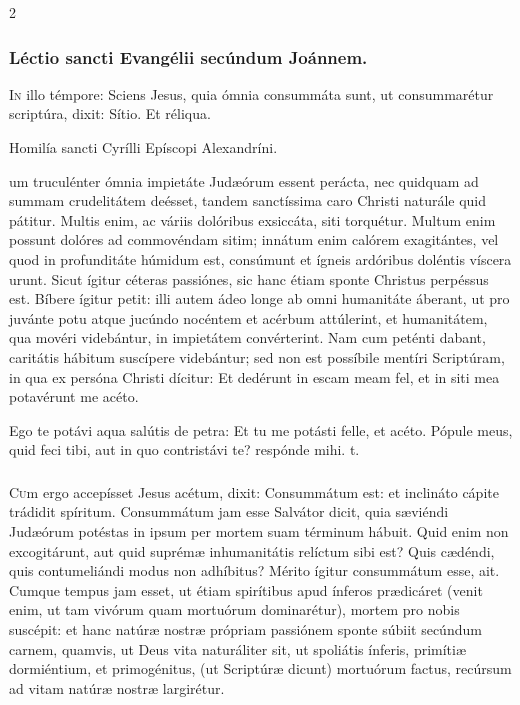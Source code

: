 \documentclass[9pt,twoside]{extarticle}
\begin{document}
\begin{multicols}{2}
\subsubsection*{\center Léctio sancti Evangélii secúndum Joánnem.}
\begin{center}\end{center}
\lettrine{I}n illo témpore: Sciens Jesus, quia ómnia consummáta sunt, ut consummarétur scriptúra, dixit: Sítio. Et réliqua.

\begin{center}Homilía sancti Cyrílli Epíscopi Alexandríni.\\
\end{center}
um truculénter ómnia impietáte Judæórum essent perácta, nec quidquam ad summam crudelitátem deésset, tandem sanctíssima caro Christi naturále quid pátitur. Multis enim, ac váriis dolóribus exsiccáta, siti torquétur. Multum enim possunt dolóres ad commovéndam sitim; innátum enim calórem exagitántes, vel quod in profunditáte húmidum est, consúmunt et ígneis ardóribus doléntis víscera urunt. Sicut ígitur céteras passiónes, sic hanc étiam sponte Christus perpéssus est. Bíbere ígitur petit: illi autem ádeo longe ab omni humanitáte áberant, ut pro juvánte potu atque jucúndo nocéntem et acérbum attúlerint, et humanitátem, qua movéri videbántur, in impietátem convérterint. Nam cum peténti dabant, caritátis hábitum suscípere videbántur; sed non est possíbile mentíri Scriptúram, in qua ex persóna Christi dícitur: Et dedérunt in escam meam fel, et in siti mea potavérunt me acéto.

\begin{tightlist}{}
\item {} Ego te potávi aqua salútis de petra: \textred{*} Et tu me potásti felle, et acéto.  Pópule meus, quid feci tibi, aut in quo contristávi te? respónde mihi. t.
\end{tightlist}

\subsubsection*{\center{}}
\lettrine{C}um ergo accepísset Jesus acétum, dixit: Consummátum est: et inclináto cápite trádidit spíritum. Consummátum jam esse Salvátor dicit, quia sæviéndi Judæórum potéstas in ipsum per mortem suam términum hábuit. Quid enim non excogitárunt, aut quid suprémæ inhumanitátis relíctum sibi est? Quis cædéndi, quis contumeliándi modus non adhíbitus? Mérito ígitur consummátum esse, ait. Cumque tempus jam esset, ut étiam spirítibus apud ínferos prædicáret (venit enim, ut tam vivórum quam mortuórum dominarétur), mortem pro nobis suscépit: et hanc natúræ nostræ própriam passiónem sponte súbiit secúndum carnem, quamvis, ut Deus vita naturáliter sit, ut spoliátis ínferis, primítiæ dormiéntium, et primogénitus, (ut Scriptúræ dicunt) mortuórum factus, recúrsum ad vitam natúræ nostræ largirétur.


\end{multicols}
\end{document}
